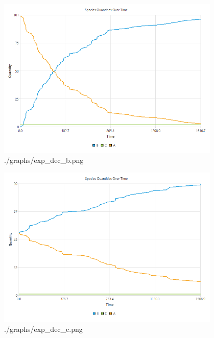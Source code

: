 \documentclass[a4paper]{article}
\begin{document}
  \begin{figure}[!htb]
    \centering
    \includegraphics[width=0.95\textwidth]{./graphs/exp_dec_b.png}
    \caption{./graphs/exp\_dec\_b.png}
  \end{figure}
  \begin{figure}[!htb]
    \centering
    \includegraphics[width=0.95\textwidth]{./graphs/exp_dec_c.png}
    \caption{./graphs/exp\_dec\_c.png}
  \end{figure}
\end{document}
